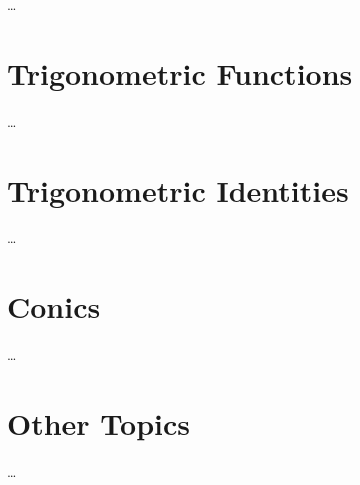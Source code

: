 \documentclass[
]{book}
\theoremstyle{definition}
\theoremstyle{definition}
\theoremstyle{definition}
\theoremstyle{definition}
\theoremstyle{remark}
\begin{document}
\ldots{}

\hypertarget{trigonometric-functions}{%
\chapter{Trigonometric Functions}\label{trigonometric-functions}}

\ldots{}

\hypertarget{trigonometric-identities}{%
\chapter{Trigonometric Identities}\label{trigonometric-identities}}

\ldots{}

\hypertarget{conics}{%
\chapter{Conics}\label{conics}}

\ldots{}

\hypertarget{other-topics}{%
\chapter{Other Topics}\label{other-topics}}

\ldots{}
\end{document}
